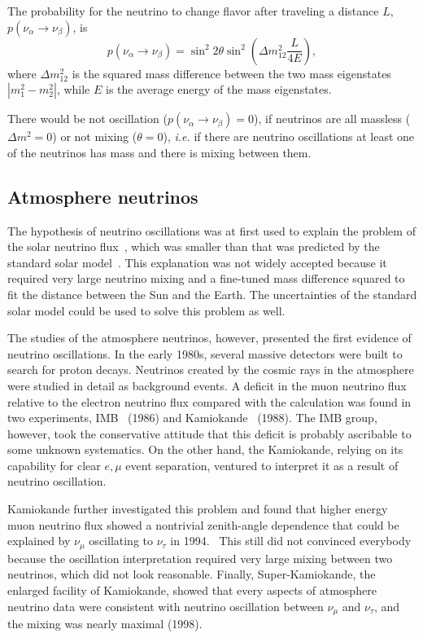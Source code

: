 The probability for the neutrino to change flavor after traveling a
distance $L$, $p(\nu_\alpha \rightarrow \nu_\beta)$, is
\begin{equation}
  \label{eq:pa2b}
  p(\nu_\alpha \rightarrow \nu_\beta)=
  \sin^{2}2\theta\sin^{2}\left(\Delta m^{2}_{12}\frac{L}{4E}\right),
\end{equation}
where $\Delta m^{2}_{12}$ is the squared mass difference between the
two mass eigenstates $|m^{2}_{1} - m^{2}_{2}|$, while $E$ is the
average energy of the mass eigenstates.

There would be not oscillation ($p(\nu_\alpha \rightarrow \nu_\beta) =
0$), if neutrinos are all massless ($\Delta m^{2} = 0$) or not mixing
($\theta = 0$), \textit{i.e.} if there are neutrino oscillations at
least one of the neutrinos has mass and there is mixing between them.

\subsection{Atmosphere neutrinos}
\label{sec:atmo}
The hypothesis of neutrino oscillations was at first used to explain
the problem of the solar neutrino flux~\cite{Dav64,Dav68}, which was
smaller than that was predicted by the standard solar
model~\cite{Bah98}. This explanation was not widely accepted because
it required very large neutrino mixing and a fine-tuned mass
difference squared to fit the distance between the Sun and the Earth.
The uncertainties of the standard solar model could be used to solve
this problem as well.

The studies of the atmosphere neutrinos, however, presented the first
evidence of neutrino oscillations. In the early 1980s, several massive
detectors were built to search for proton decays. Neutrinos created by
the cosmic rays in the atmosphere were studied in detail as background
events. A deficit in the muon neutrino flux relative to the electron
neutrino flux compared with the calculation was found in two
experiments, IMB~\cite{Hai86} (1986) and Kamiokande~\cite{Hir88}
(1988). The IMB group, however, took the conservative attitude that
this deficit is probably ascribable to some unknown systematics. On
the other hand, the Kamiokande, relying on its capability for clear
$e, \mu$ event separation, ventured to interpret it as a result of
neutrino oscillation.

Kamiokande further investigated this problem and found that higher
energy muon neutrino flux showed a nontrivial zenith-angle dependence
that could be explained by $\nu_\mu$ oscillating to $\nu_\tau$ in
1994.~\cite{Fuk94} This still did not convinced everybody because the
oscillation interpretation required very large mixing between two
neutrinos, which did not look reasonable. Finally, Super-Kamiokande,
the enlarged facility of Kamiokande, showed that every aspects of
atmosphere neutrino data were consistent with neutrino oscillation
between $\nu_\mu$ and $\nu_\tau$, and the mixing was nearly maximal
(1998).~\cite{Fuk98}

